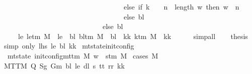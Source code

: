 \begin{isabellebody}
\ \ \ \ \ \ \ \ \ \ \ \ \ \ \ \ \ \ \ \ \ \ \ \ \ \ \ \ \ \ \ \ \ \ \ else\ if\ k\ {\isacharequal}{\kern0pt}\ {}\ {\isasymand}\ n\ {\isasymle}\ length\ w\ then\ w\ {\isacharbang}{\kern0pt}\ {\isacharparenleft}{\kern0pt}n\ {\isacharminus}{\kern0pt}\ {}{\isacharparenright}{\kern0pt}\isanewline
\ \ \ \ \ \ \ \ \ \ \ \ \ \ \ \ \ \ \ \ \ \ \ \ \ \ \ \ \ \ \ \ \ \ \ else\ bl{\isacharparenright}{\kern0pt}\isanewline
\ \ \ \ \ \ \ \ \ \ \ \ \ \ \ \ \ \ \ \ \ \ \ \ \ \ \ \ \ else\ bl{\isacharparenright}{\kern0pt}{\isachardoublequoteclose}\isanewline
\ \ \ \ \ le{\isacharprime}{\kern0pt}{\isacharcolon}{\kern0pt}\ {\isachardoublequoteopen}le{\isacharunderscore}{\kern0pt}tm\ M\ {\isacharequal}{\kern0pt}\ le{\isachardoublequoteclose}\ \ bl{\isacharprime}{\kern0pt}{\isacharcolon}{\kern0pt}\ {\isachardoublequoteopen}bl{\isacharunderscore}{\kern0pt}tm\ M\ {\isacharequal}{\kern0pt}\ bl{\isachardoublequoteclose}\ \ kk{\isacharprime}{\kern0pt}{\isacharcolon}{\kern0pt}\ {\isachardoublequoteopen}k{\isacharunderscore}{\kern0pt}tm\ M\ {\isacharequal}{\kern0pt}\ kk{\isachardoublequoteclose}\isanewline
\ \ \ \ \isamarkupfalse%
\ simp{\isacharunderscore}{\kern0pt}all\isanewline
\ \ \isamarkupfalse%
\ {\isacharquery}{\kern0pt}thesis\ \isamarkupfalse%
\ {\isacharparenleft}{\kern0pt}simp\ only{\isacharcolon}{\kern0pt}\ lhs\ le{\isacharprime}{\kern0pt}\ bl{\isacharprime}{\kern0pt}\ kk{\isacharprime}{\kern0pt}{\isacharparenright}{\kern0pt}\isanewline
{}\isamarkupfalse%
%
\endisatagproof
{\isafoldproof}%
%
\isadelimproof
\isanewline
%
\endisadelimproof
\isanewline
{}\isamarkupfalse%
\ mt{\isacharunderscore}{\kern0pt}state{\isacharunderscore}{\kern0pt}init{\isacharunderscore}{\kern0pt}config{\isacharcolon}{\kern0pt}\isanewline
\ \ {\isachardoublequoteopen}mt{\isacharunderscore}{\kern0pt}state\ {\isacharparenleft}{\kern0pt}init{\isacharunderscore}{\kern0pt}config{\isacharunderscore}{\kern0pt}mttm\ M\ w{\isacharparenright}{\kern0pt}\ {\isacharequal}{\kern0pt}\ s{\isacharunderscore}{\kern0pt}tm\ M{\isachardoublequoteclose}\isanewline
%
\isadelimproof
%
\endisadelimproof
%
\isatagproof
{}\isamarkupfalse%
\ {\isacharparenleft}{\kern0pt}cases\ M{\isacharparenright}{\kern0pt}\isanewline
\ \ \isamarkupfalse%
\ {\isacharparenleft}{\kern0pt}MTTM\ Q\ Sg\ Gm\ bl\ le\ dl\ s\ tt\ rr\ kk{\isacharparenright}{\kern0pt}\isanewline
\ \ \isamarkupfalse%
\ \isamarkupfalse%

\end{isabellebody}
